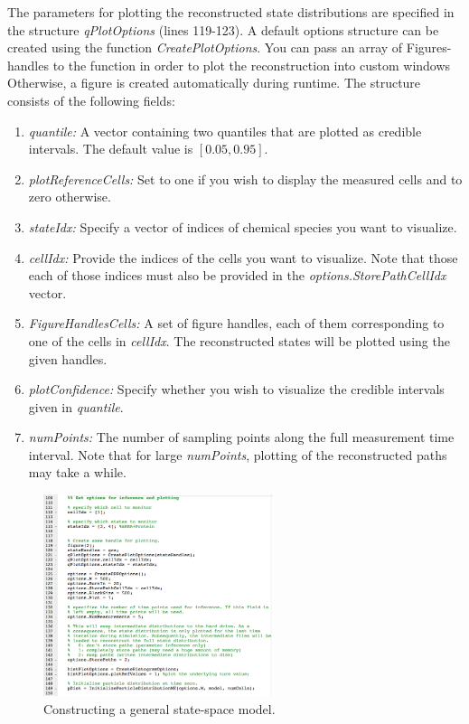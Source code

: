 \documentclass[a4paper, 9pt]{scrartcl}
\begin{document}
The parameters for plotting the reconstructed state distributions are specified in the structure \textit{qPlotOptions} (lines 119-123). A default options structure can be created using the function \textit{CreatePlotOptions}. You can pass an array of Figures-handles to the function in order to plot the reconstruction into custom windows Otherwise, a figure is created automatically during runtime. The structure consists of the following fields:
\begin{enumerate}
	\item \textit{quantile:} A vector containing two quantiles that are plotted as credible intervals. The default value is $[0.05, 0.95]$.
	\item \textit{plotReferenceCells:} Set to one if you wish to display the measured cells and to zero otherwise.
	\item \textit{stateIdx:} Specify a vector of indices of chemical species you want to visualize.
	\item \textit{cellIdx:} Provide the indices of the cells you want to visualize. Note that those each of those indices must also be provided in the \textit{options.StorePathCellIdx} vector.
	\item \textit{FigureHandlesCells:} A set of figure handles, each of them corresponding to one of the cells in \textit{cellIdx}. The reconstructed states will be plotted using the given handles.
	\item \textit{plotConfidence:} Specify whether you wish to visualize the credible intervals given in \textit{quantile}.
	\item \textit{numPoints:} The number of sampling points along the full measurement time interval. Note that for large \textit{numPoints}, plotting of the reconstructed paths may take a while.
\end{enumerate}

\begin{figure}[htbp]
\begin{center}
	\includegraphics[width=0.6\textwidth]{figures/Doc_Options}
\caption{Constructing a general state-space model.}
\label{fig:Options}
\end{center}
\end{figure}
\end{document}
